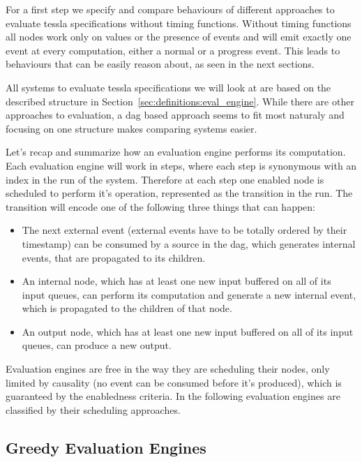 For a first step we specify and compare behaviours of different approaches to evaluate \gls{tessla} specifications without timing functions.
Without timing functions all nodes work only on values or the presence of events and will emit exactly one event at every computation, either a normal or a progress event.
This leads to behaviours that can be easily reason about, as seen in the next sections.

All systems to evaluate \gls{tessla} specifications we will look at are based on the described structure in Section~\ref{sec:definitions:eval_engine}.
While there are other approaches to evaluation, a \gls{dag} based approach seems to fit most naturaly and focusing on one structure makes comparing systems easier.

Let's recap and summarize how an evaluation engine performs its computation.
Each evaluation engine will work in steps, where each step is synonymous with an index in the run of the system.
Therefore at each step one enabled node is scheduled to perform it's operation, represented as the transition in the run.
The transition will encode one of the following three things that can happen:

\begin{itemize}
  \item The next external event (external events have to be totally ordered by their timestamp) can be consumed by a source in the \gls{dag}, which generates internal events, that are propagated to its children.
  \item An internal node, which has at least one new input buffered on all of its input queues, can perform its computation and generate a new internal event, which is propagated to the children of that node.
  \item An output node, which has at least one new input buffered on all of its input queues, can produce a new output.
\end{itemize}

Evaluation engines are free in the way they are scheduling their nodes, only limited by causality (no event can be consumed before it's produced), which is guaranteed by the enabledness criteria.
In the following evaluation engines are classified by their scheduling approaches.

\subsection{Greedy Evaluation Engines}
\label{sec:behaviours:without_timing:greedy}

